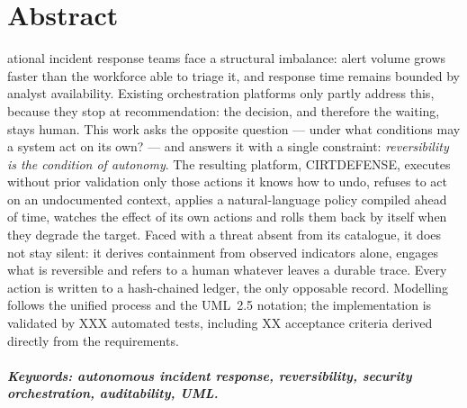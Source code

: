 \chapter*{Abstract}
ational incident response teams face a structural imbalance: alert
volume grows faster than the workforce able to triage it, and response time
remains bounded by analyst availability. Existing orchestration platforms only
partly address this, because they stop at recommendation: the decision, and
therefore the waiting, stays human. This work asks the opposite question ---
under what conditions may a system act on its own? --- and answers it with a
single constraint: \emph{reversibility is the condition of autonomy}. The
resulting platform, CIRTDEFENSE, executes without prior validation only those
actions it knows how to undo, refuses to act on an undocumented context, applies
a natural-language policy compiled ahead of time, watches the effect of its own
actions and rolls them back by itself when they degrade the target. Faced with a
threat absent from its catalogue, it does not stay silent: it derives containment
from observed indicators alone, engages what is reversible and refers to a human
whatever leaves a durable trace. Every action is written to a hash-chained ledger,
the only opposable record. Modelling follows the unified process and the UML~2.5
notation; the implementation is validated by XXX automated tests, including XX
acceptance criteria derived directly from the requirements.

\paragraph{Keywords: autonomous incident response, reversibility, security
orchestration, auditability, UML.}

\clearpage
